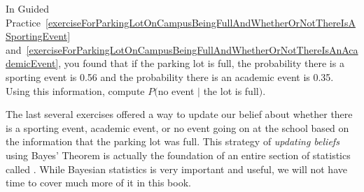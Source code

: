 \begin{exercisewrap}
\begin{nexercise} \label{exerciseForParkingLotOnCampusBeingFullAndWhetherOrNotThereIsNoEvent}
In Guided Practice~\ref{exerciseForParkingLotOnCampusBeingFullAndWhetherOrNotThereIsASportingEvent} and~\ref{exerciseForParkingLotOnCampusBeingFullAndWhetherOrNotThereIsAnAcademicEvent}, you found that if the parking lot is full, the probability there is a sporting event is 0.56 and the probability there is an academic event is 0.35. Using this information, compute $P($no event $|$ the lot is full$)$.\footnotemark
\end{nexercise}
\end{exercisewrap}

The last several exercises offered a way to update our belief about whether there is a sporting event, academic event, or no event going on at the school based on the information that the parking lot was full. This strategy of \emph{updating beliefs} using Bayes' Theorem is actually the foundation of an entire section of statistics called . While Bayesian statistics is very important and useful, we will not have time to cover much more of it in this book.



{}
